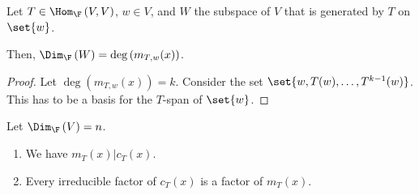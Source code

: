 \documentclass[10pt]{mypackage}
\begin{document}
\begin{lemma}
  Let $T\in \Hom_{\F}\left(V,V\right)$, $w\in V$, and $W$ the subspace of $V$ that is generated by $T$ on $\set{w}$.\newline

  Then, $\Dim_{\F}\left(W\right) = \deg\left(m_{T,w}(x)\right)$.
\end{lemma}
\begin{proof}
  Let $\deg\left(m_{T,w}(x)\right) = k$. Consider the set $\set{w,T(w),\dots,T^{k-1}(w)}$. This has to be a basis for the $T$-span of $\set{w}$.
\end{proof}
\begin{theorem}
  Let $\Dim_{\F}\left(V\right) = n$.
  \begin{enumerate}[(1)]
    \item We have $m_{T}(x)|c_{T}(x)$.
    \item Every irreducible factor of $c_T(x)$ is a factor of $m_{T}(x)$.
  \end{enumerate}
\end{theorem}
\end{document}
